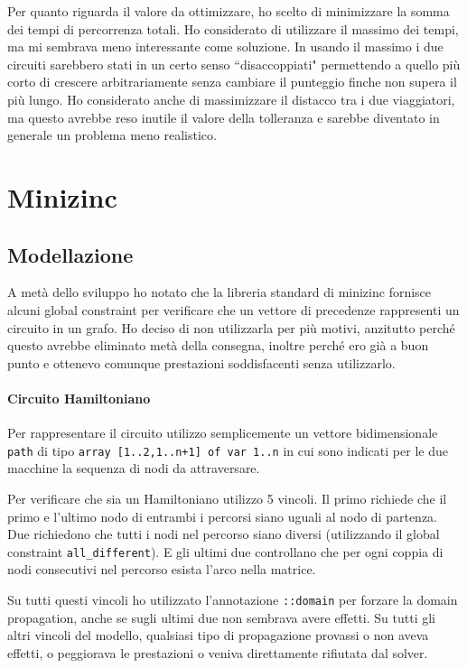 \documentclass[11pt, a4paper]{article}
\begin{document}
Per quanto riguarda il valore da ottimizzare, ho scelto di minimizzare la somma dei tempi di percorrenza totali.
Ho considerato di utilizzare il massimo dei tempi, ma mi sembrava meno interessante come soluzione. In usando il massimo i due circuiti sarebbero stati in un certo senso ``disaccoppiati" permettendo a quello più corto di crescere arbitrariamente senza cambiare il punteggio finche non supera il più lungo.
Ho considerato anche di massimizzare il distacco tra i due viaggiatori, ma questo avrebbe reso inutile il valore della tolleranza e sarebbe diventato in generale un problema meno realistico.

\section{Minizinc}

\subsection{Modellazione}

A metà dello sviluppo ho notato che la libreria standard di minizinc fornisce alcuni global constraint per verificare che un vettore di precedenze rappresenti un circuito in un grafo. Ho deciso di non utilizzarla per più motivi, anzitutto perché questo avrebbe eliminato metà della consegna, inoltre perché ero già a buon punto e ottenevo comunque prestazioni soddisfacenti senza utilizzarlo.

\paragraph{Circuito Hamiltoniano}
Per rappresentare il circuito utilizzo semplicemente un vettore bidimensionale \lstinline{path} di tipo \lstinline{array [1..2,1..n+1] of var 1..n} in cui sono indicati per le due macchine la sequenza di nodi da attraversare.

Per verificare che sia un Hamiltoniano utilizzo 5 vincoli. Il primo richiede che il primo e l'ultimo nodo di entrambi i percorsi siano uguali al nodo di partenza.
Due richiedono che tutti i nodi nel percorso siano diversi (utilizzando il global constraint \lstinline{all_different}). E gli ultimi due controllano che per ogni coppia di nodi consecutivi nel percorso esista l'arco nella matrice.

Su tutti questi vincoli ho utilizzato l'annotazione \lstinline{::domain} per forzare la domain propagation, anche se sugli ultimi due non sembrava avere effetti. Su tutti gli altri vincoli del modello, qualsiasi tipo di propagazione provassi o non aveva effetti, o peggiorava le prestazioni o veniva direttamente rifiutata dal solver.
\end{document}
